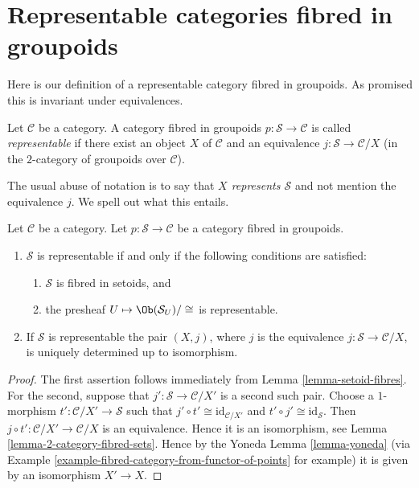 \section{Representable categories fibred in groupoids}
\label{section-representable-fibred-groupoids}

\noindent
Here is our definition of a representable category fibred in groupoids.
As promised this is invariant under equivalences.

\begin{definition}
\label{definition-representable-fibred-category}
Let $\mathcal{C}$ be a category.
A category fibred in groupoids $p : \mathcal{S} \to \mathcal{C}$ is
called {\it representable} if there exist an object
$X$ of $\mathcal{C}$ and an equivalence $j : \mathcal{S} \to \mathcal{C}/X$
(in the $2$-category of groupoids over $\mathcal{C}$).
\end{definition}

\noindent
The usual abuse of notation is to say that {\it $X$ represents $\mathcal{S}$}
and not mention the equivalence $j$. We spell out what this entails.

\begin{lemma}
\label{lemma-characterize-representable-fibred-category}
Let $\mathcal{C}$ be a category.
Let $p : \mathcal{S} \to \mathcal{C}$ be a category fibred in groupoids.
\begin{enumerate}
\item $\mathcal{S}$ is representable if and only if
the following conditions are satisfied:
\begin{enumerate}
\item $\mathcal{S}$ is fibred in setoids, and
\item the presheaf $U \mapsto \Ob(\mathcal{S}_U)/\cong$ is
representable.
\end{enumerate}
\item If $\mathcal{S}$ is representable the pair $(X, j)$, where $j$ is the
equivalence $j : \mathcal{S} \to \mathcal{C}/X$, is uniquely determined
up to isomorphism.
\end{enumerate}
\end{lemma}

\begin{proof}
The first assertion follows immediately from
Lemma \ref{lemma-setoid-fibres}.
For the second, suppose that $j' : \mathcal{S} \to \mathcal{C}/X'$ is
a second such pair. Choose a $1$-morphism
$t' : \mathcal{C}/X' \to \mathcal{S}$ such that
$j' \circ t' \cong \text{id}_{\mathcal{C}/X'}$ and
$t' \circ j' \cong \text{id}_\mathcal{S}$. Then
$j \circ t' : \mathcal{C}/X' \to \mathcal{C}/X$ is an equivalence.
Hence it is an isomorphism, see Lemma \ref{lemma-2-category-fibred-sets}.
Hence by the Yoneda Lemma \ref{lemma-yoneda} (via
Example \ref{example-fibred-category-from-functor-of-points} for example)
it is given by an isomorphism $X' \to X$.
\end{proof}

